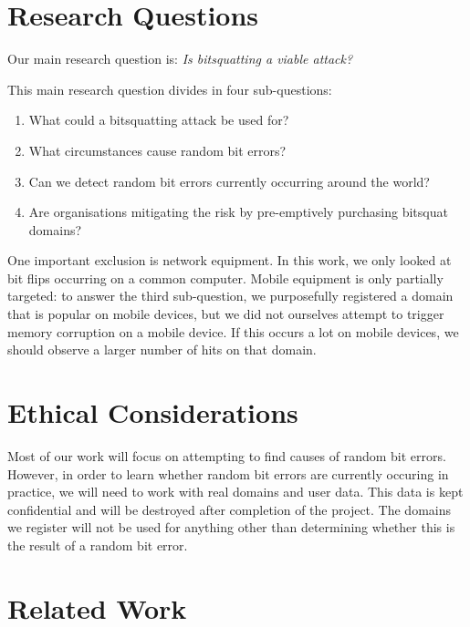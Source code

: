 \documentclass[conference]{IEEEtran}
\begin{document}
\section{Research Questions}\label{sec:researchq}

Our main research question is:
{\it Is bitsquatting a viable attack?}

\vspace{0.1cm}

\noindent{} This main research question divides in four sub-questions:

\begin{enumerate}
    \item What could a bitsquatting attack be used for?
	\item What circumstances cause random bit errors?
	\item Can we detect random bit errors currently occurring around the world?
	\item Are organisations mitigating the risk by pre-emptively purchasing
	      bitsquat domains?
\end{enumerate}

One important exclusion is network equipment. In this work, we only looked at
bit flips occurring on a common computer. Mobile equipment is only partially
targeted: to answer the third sub-question, we purposefully registered a domain
that is popular on mobile devices, but we did not ourselves attempt to trigger
memory corruption on a mobile device. If this occurs a lot on mobile devices,
we should observe a larger number of hits on that domain.


\section{Ethical Considerations}\label{sec:ethics}

Most of our work will focus on attempting to find causes of random bit errors.
However, in order to learn whether random bit errors are currently occuring in
practice, we will need to work with real domains and user data. This data is
kept confidential and will be destroyed after completion of the project. The
domains we register will not be used for anything other than determining
whether this is the result of a random bit error.


\section{Related Work}\label{sec:relwork}
\end{document}
